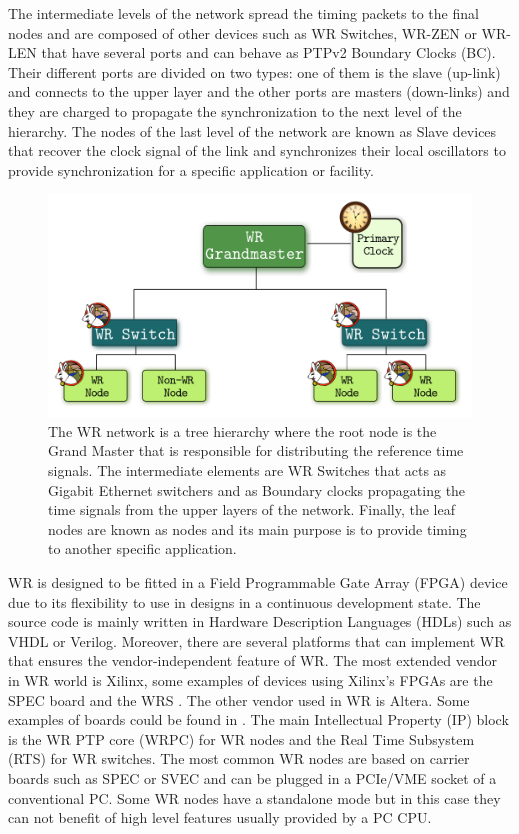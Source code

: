 The intermediate levels of the network spread the timing packets to the final 
nodes and are composed of other devices such as WR Switches, WR-ZEN or WR-LEN 
that have several ports and can behave as PTPv2 Boundary Clocks (BC). Their 
different ports are divided on two types: one of them is the slave (up-link) 
and connects to the upper layer and the other ports are masters (down-links) 
and they are charged to propagate the synchronization to the next level of the 
hierarchy. The nodes of the last level of the network are known as Slave 
devices that recover the clock signal of the link and synchronizes their local 
oscillators to provide synchronization for a specific application or facility.

\begin{figure}[H]
	\centering
	\includegraphics[scale=0.4]{img/wr_hierarchy}
	\caption{The WR network is a tree hierarchy where the root node is the Grand Master that is responsible for distributing the reference time signals. The intermediate elements are WR Switches that acts as Gigabit Ethernet switchers and as Boundary clocks propagating the time signals from the upper layers of the network. Finally, the leaf nodes are known as nodes and its main purpose is to provide timing to another specific application.}
	\label{fig:wr_hierarchy}
\end{figure}


WR is designed to be fitted in a Field Programmable Gate Array (FPGA) device due to its flexibility to use in designs in a continuous development state. The source code is mainly written in Hardware Description Languages (HDLs) such as VHDL or Verilog. Moreover, there are several platforms that can implement WR that ensures the vendor-independent feature of WR. The most extended vendor in WR world is Xilinx, some examples of devices using Xilinx's FPGAs are the SPEC board \cite{ohwr:spec} and the WRS \cite{ohwr:wrs}. The other vendor used in WR is Altera. Some examples of boards could be found in \cite{cesar-altera-wr}. The main Intellectual Property (IP) block is the WR PTP core (WRPC) for WR nodes and the Real Time Subsystem (RTS) for WR switches. The most common WR nodes are based on carrier boards such as SPEC or SVEC and can be plugged in a PCIe/VME socket of a conventional PC. Some WR nodes have a standalone mode but in this case they can not benefit of high level features usually provided by a PC CPU.

